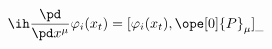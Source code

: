 \begin{equation}	\label{12.72}
\ih\frac{\pd}{\pd x^\mu} \varphi_i(x_t)
=
[\varphi_i(x_t), \ope[0]{P}_\mu ]_{\_}
	\end{equation}

